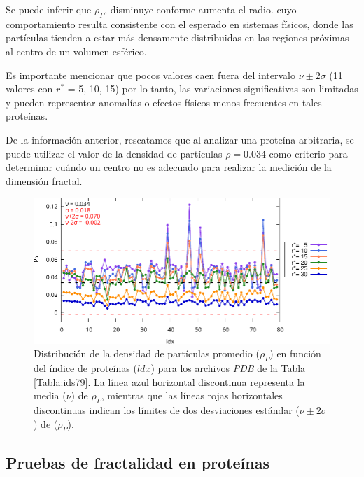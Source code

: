  	
 	
 	Se puede inferir que $\rho_P$, disminuye conforme aumenta el radio. cuyo comportamiento resulta consistente con el esperado en sistemas físicos, donde las partículas tienden a estar más densamente distribuidas en las regiones próximas al centro de un volumen esférico.
 	
 	Es importante mencionar que pocos valores caen fuera del intervalo $\nu \pm 2\sigma$ (11 valores con $r^*$ = 5, 10, 15) por lo tanto, las variaciones significativas son limitadas y pueden representar anomalías o efectos físicos menos frecuentes en tales prote\'{i}nas.
 	
 	De la informaci\'{o}n anterior, rescatamos que al analizar una prote\'{i}na arbitraria, se puede utilizar el valor de la densidad de part\'{i}culas $\rho = 0.034$ como criterio para determinar cu\'{a}ndo un centro no es adecuado para realizar la medici\'{o}n de la dimensi\'{o}n fractal. 
 	
 	\begin{figure}[h!]
 		\centering
 		\includegraphics[width=\linewidth]{graphs/ldx-dp.pdf}
 		\caption{Distribución de la densidad de 
 			partículas promedio ($\rho_P$) en función del 
 			\'{i}ndice de prote\'{i}nas ($ldx$) para los 
 			archivos \emph{PDB} de la Tabla 
 			\ref{Tabla:ids79}. La línea azul horizontal 
 			discontinua representa la media ($\nu$) de   
 			$\rho_P$, mientras que las líneas rojas horizontales discontinuas indican los límites de dos desviaciones estándar (\(\nu \pm 2\sigma\)) de ($\rho_P$).}
 		\label{index-vs-density}
 	\end{figure}
 	
 	\color{black}
 	
	\subsection{Pruebas de fractalidad en proteínas}
	\label{sec:pfp}
 	
